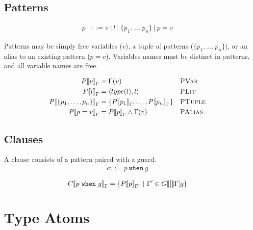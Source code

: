 \documentclass[nonacm,timestamp,manuscript]{acmart}
\newcommand{\alt}{\ |\ }
\newcommand{\singleton}[2]{\langle #1, #2 \rangle} %
\newcommand{\res}[1]{\texttt{#1}}
\begin{document}
\subsection{Patterns}
\begin{align*}
  p &{}::= v \alt l \alt \{ p_1, \ldots, p_n \} \alt p = v
\end{align*}

Patterns may be simply free variables ($v$), a tuple of patterns
($\{ p_1, \ldots, p_n \}$), or an alias to an existing pattern ($p = v$). Variables
names must be distinct in patterns, and all variable names are free.

\newcommand{\Pden}[2][\Gamma]{{P\llbracket{} #2 \rrbracket{}}_{#1}}
\begin{definition}
\begin{align*}
  \Pden{v
  } ={}& \Gamma(v)
  && \textsc{PVar} \\
  \Pden{l
  } ={}& \singleton{type(l)}{l}
  && \textsc{PLit} \\
  \Pden{ \{ p_1, \ldots, p_n\}
  } ={}& \{ \Pden{p_1}, \ldots, \Pden{p_n} \}
  && \textsc{PTuple} \\
  \Pden{p = v
  } ={}& \Pden{p} \land \Gamma(v)
  && \textsc{PAlias}
\end{align*}
\end{definition}

\subsection{Clauses}

A clause consists of a pattern paired with a guard.
\begin{align*}
  c ::= p\ \res{when}\ g
\end{align*}

\newcommand{\Cden}[2][\Gamma]{{C \llbracket{} #2 \rrbracket}_{#1}}

\begin{definition}

  \begin{align*}
    \Cden{p\ \res{when}\ g} = \left\{ \Pden[\Gamma^{\prime}]{p}\ \middle|\ \Gamma^{\prime} \in \Gden[\Gamma]{g} \right\}
  \end{align*}
\end{definition}

\begin{definition}
\end{definition}


\section{Type Atoms}
\end{document}
